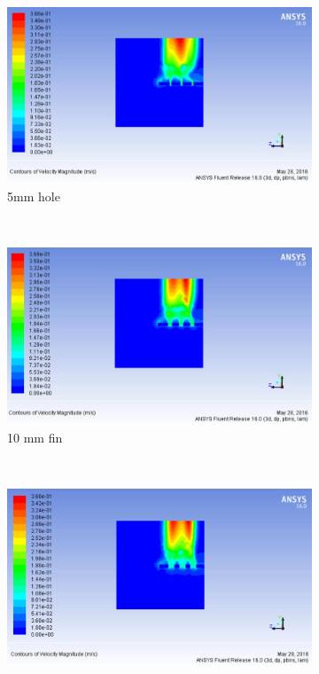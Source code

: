 \begin{figure}[h]
 	\begin{subfigure}[b]{0.5\textwidth}
 		\includegraphics[width=\textwidth]{133.jpg}
 		\caption{5mm hole}
 		\label{fig:structured}
 	\end{subfigure}%
 	~ %
 	\begin{subfigure}[b]{0.5\textwidth}
 		\includegraphics[width=\textwidth]{134.jpg}
 		\caption{10 mm fin}
 		\label{fig:unstructured}
 	\end{subfigure}
 	~ %
 	\begin{subfigure}[b]{0.5\textwidth}
 		\includegraphics[width=\textwidth]{135.jpg}

\end{subfigure}
\end{figure}
